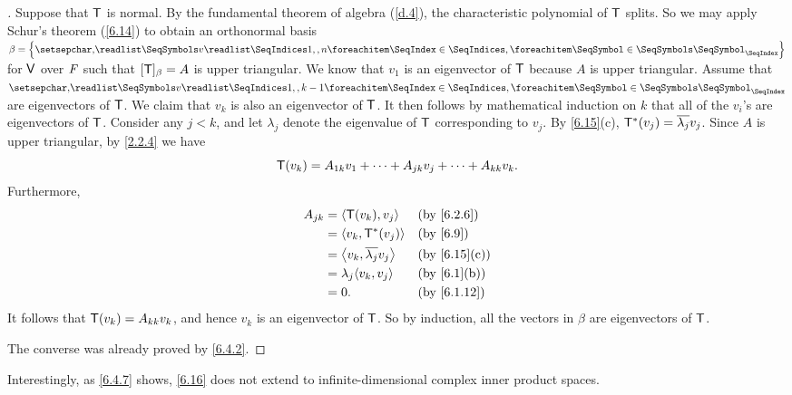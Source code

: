 \begin{proof}[]
  Suppose that \(\mathsf{T}\) is normal.
  By the fundamental theorem of algebra (\cref{d.4}), the characteristic polynomial of \(\mathsf{T}\) splits.
  So we may apply Schur's theorem (\cref{6.14}) to obtain an orthonormal basis \(\beta = \set{\seq{v}{1,,n}}\) for \(\mathsf{V}\) over \(\mathit{F}\) such that \([\mathsf{T}]_{\beta} = A\) is upper triangular.
  We know that \(v_1\) is an eigenvector of \(\mathsf{T}\) because \(A\) is upper triangular.
  Assume that \(\seq{v}{1,,k-1}\) are eigenvectors of \(\mathsf{T}\).
  We claim that \(v_k\) is also an eigenvector of \(\mathsf{T}\).
  It then follows by mathematical induction on \(k\) that all of the \(v_i\)'s are eigenvectors of \(\mathsf{T}\).
  Consider any \(j < k\), and let \(\lambda_j\) denote the eigenvalue of \(\mathsf{T}\) corresponding to \(v_j\).
  By \cref{6.15}(c), \(\mathsf{T}^*(v_j) = \overline{\lambda_j} v_j\).
  Since \(A\) is upper triangular, by \cref{2.2.4} we have
  \[
    \mathsf{T}(v_k) = A_{1 k} v_1 + \cdots + A_{j k} v_j + \cdots + A_{k k} v_k.
  \]
  Furthermore,
  \begin{align*}
    A_{j k} & = \inn{\T(v_k), v_j}              &  & \text{(by \cref{6.2.6})}   \\
            & = \inn{v_k, \T^*(v_j)}            &  & \text{(by \cref{6.9})}     \\
            & = \inn{v_k, \conj{\lambda_j} v_j} &  & \text{(by \cref{6.15}(c))} \\
            & = \lambda_j \inn{v_k, v_j}        &  & \text{(by \cref{6.1}(b))}  \\
            & = 0.                              &  & \text{(by \cref{6.1.12})}
  \end{align*}
  It follows that \(\mathsf{T}(v_k) = A_{k k} v_k\), and hence \(v_k\) is an eigenvector of \(\mathsf{T}\).
  So by induction, all the vectors in \(\beta\) are eigenvectors of \(\mathsf{T}\).

  The converse was already proved by \cref{6.4.2}.
\end{proof}

\begin{note}
  Interestingly, as \cref{6.4.7} shows, \cref{6.16} does not extend to infinite-dimensional complex inner product spaces.
\end{note}

